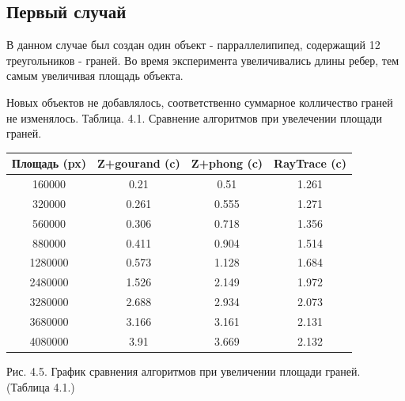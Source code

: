 \documentclass[12pt]{report}
\begin{document}
	\subsection{Первый случай}
	
	В данном случае был создан один объект - парраллелипипед, содержащий 12 треугольников - граней.
	Во время эксперимента увеличивались длины ребер, тем самым увеличивая площадь объекта.
	
	Новых объектов не добавлялось, соответственно суммарное колличество граней не изменялось.
	\newpage
	Таблица. 4.1. Сравнение алгоритмов при увелечении площади граней.
	
	\begin{center}
		\begin{tabular}{|c c c c|}
			\hline
			Площадь (px) & Z+gourand (c) & Z+phong (c) & RayTrace (c) \\ [0.5ex]
			\hline
			160000 & 0.21 & 0.51 & 1.261 \\ 
			\hline 
			320000 & 0.261 & 0.555 & 1.271 \\ 
			\hline 
			560000 & 0.306 & 0.718 & 1.356 \\ 
			\hline 
			880000 & 0.411 & 0.904 & 1.514 \\ 
			\hline 
			1280000 & 0.573 & 1.128 & 1.684 \\ 
			\hline 
			2480000 & 1.526 & 2.149 & 1.972 \\ 
			\hline 
			3280000 & 2.688 & 2.934 & 2.073 \\
			\hline
			3680000 & 3.166 & 3.161 & 2.131 \\
			\hline
			4080000 & 3.91 & 3.669 & 2.132 \\
			\hline 
		\end{tabular}
	\end{center}

	\begin{center}
		\begin{center}
		\end{center}
		Рис. 4.5. График сравнения алгоритмов при увеличении площади граней. (Таблица 4.1.)
	\end{center}
\end{document}

